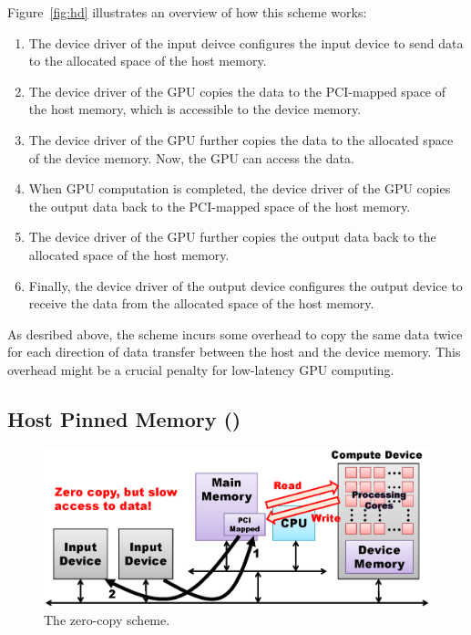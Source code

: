 Figure~\ref{fig:hd} illustrates an overview of how this scheme works:
\begin{enumerate}
 \item The device driver of the input deivce configures the input device
       to send data to the allocated space of the host memory.
 \item The device driver of the GPU copies the data to the
       PCI-mapped space of the host memory, which is accessible to the
       device memory.
 \item The device driver of the GPU further copies the data to the
       allocated space of the device memory.
       Now, the GPU can access the data.
 \item When GPU computation is completed, the device driver of the
       GPU copies the output data back to the PCI-mapped space of the
       host memory.
 \item The device driver of the GPU further copies the output data back
       to the allocated space of the host memory.
 \item Finally, the device driver of the output device configures the
       output device to receive the data from the allocated space of the
       host memory.
\end{enumerate}

As desribed above, the {\hd} scheme incurs some overhead to copy the
same data twice for each direction of data transfer between the host and
the device memory.
This overhead might be a crucial penalty for low-latency GPU computing.

\subsection{Host Pinned Memory ({\hp})}
\label{sec:hp}

\begin{figure}[!t]
 \centering
 \includegraphics[width=\hsize]{eps/hp.eps}
 \caption{The zero-copy {\hp} scheme.}
 \label{fig:hp}
\end{figure}

